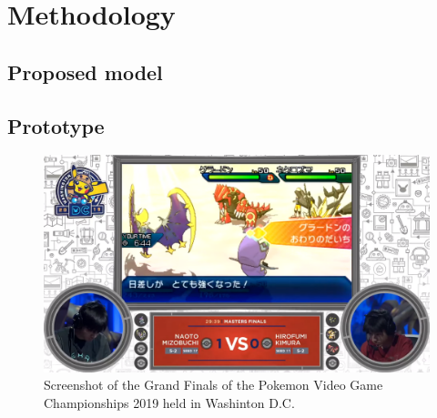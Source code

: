 \chapter{Methodology}\label{ch:4}

\section{Proposed model}

\section{Prototype}

\begin{figure}
  \centering
  \includegraphics[width=\columnwidth]{resources/1_intro/vgc2019.png}
    \caption{Screenshot of the Grand Finals of the Pokemon Video Game Championships 2019 held in Washinton D.C.}
\end{figure}